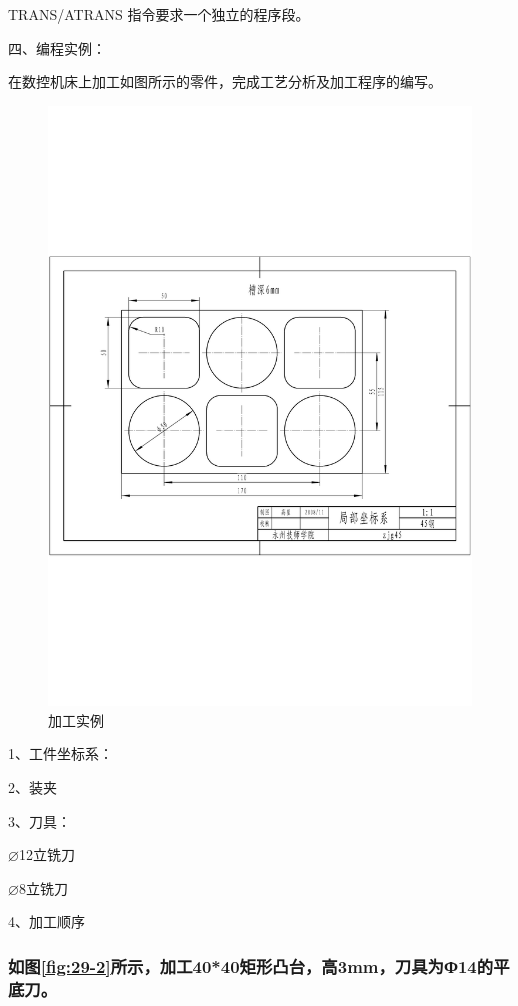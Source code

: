 	TRANS/ATRANS 指令要求一个独立的程序段。

	四、编程实例：

	在数控机床上加工如图所示的零件，完成工艺分析及加工程序的编写。
	
	\begin{figure}
		\centering
		\includegraphics[width=0.9\linewidth,trim=50 285 50  250,clip]{data/image/29-1}
		\caption{加工实例}
		\label{fig:29-1}
	\end{figure}

1、工件坐标系：

2、装夹

3、刀具：

$\varnothing$12立铣刀

$\varnothing$8立铣刀

4、加工顺序

	
\subsubsection{如图\ref{fig:29-2}所示，加工40*40矩形凸台，高3mm，刀具为Ф14的平底刀。}

